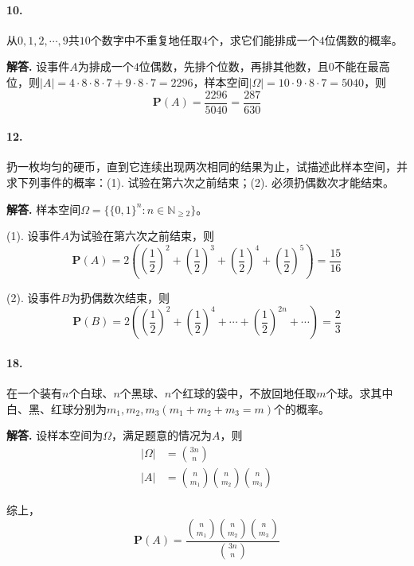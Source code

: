 \documentclass[12pt, a4paper, oneside]{ctexart}
\newenvironment{solution}{\par\noindent\textbf{解答. }}{\bigskip\par}
\begin{document}
\paragraph{10.}从$0,1,2,\cdots,9$共$10$个数字中不重复地任取$4$个，求它们能排成一个$4$位偶数的概率。
\begin{solution}
    设事件$A$为排成一个$4$位偶数，先排个位数，再排其他数，且$0$不能在最高位，则$|A| = 4\cdot8\cdot8\cdot7+9\cdot8\cdot7 = 2296$，样本空间$|\Omega| = 10\cdot9\cdot8\cdot7=5040$，则
    \begin{equation*}
        \textbf{P}(A) = \frac{2296}{5040} = \frac{287}{630}
    \end{equation*}
\end{solution}
\paragraph{12.}扔一枚均匀的硬币，直到它连续出现两次相同的结果为止，试描述此样本空间，并求下列事件的概率：(1). 试验在第六次之前结束；(2). 必须扔偶数次才能结束。
\begin{solution}
    样本空间$\Omega = \{\{0, 1\}^n: n\in\mathbb{N}_{\geqslant 2}\}$。

    (1). 设事件$A$为试验在第六次之前结束，则
    \begin{equation*}
        \textbf{P}(A) = 2\left((\frac{1}{2})^2+(\frac{1}{2})^3+(\frac{1}{2})^4+(\frac{1}{2})^5\right) = \frac{15}{16}
    \end{equation*}

    (2). 设事件$B$为扔偶数次结束，则
    \begin{equation*}
        \textbf{P}(B) = 2\left((\frac{1}{2})^2+(\frac{1}{2})^4+\cdots+(\frac{1}{2})^{2n}+\cdots\right) = \frac{2}{3}
    \end{equation*}
\end{solution}
\paragraph{18.} 在一个装有$n$个白球、$n$个黑球、$n$个红球的袋中，不放回地任取$m$个球。求其中白、黑、红球分别为$m_1,m_2,m_3(m_1+m_2+m_3=m)$个的概率。
\begin{solution}
    设样本空间为$\Omega$，满足题意的情况为$A$，则
    \begin{equation*}
        \begin{aligned}
            |\Omega| &= \binom{3n}{n}\\
            |A| &= \binom{n}{m_1}\binom{n}{m_2}\binom{n}{m_3}
        \end{aligned}
    \end{equation*}

    综上，
    \begin{equation*}
        \textbf{P}(A) = \frac{\binom{n}{m_1}\binom{n}{m_2}\binom{n}{m_3}}{\binom{3n}{n}}
    \end{equation*}
\end{solution}
\end{document}
